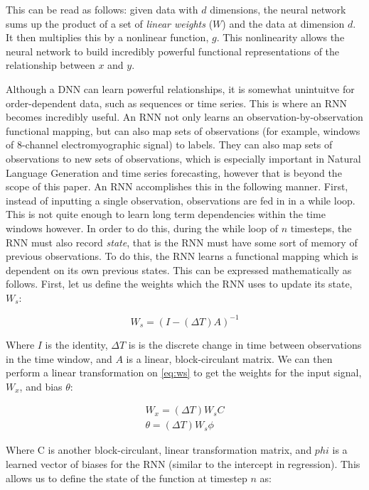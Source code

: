 \documentclass{llncs}
\begin{document}
 This can be read as follows: given data with $d$ dimensions, the neural network sums up the product of a set of \textit{linear weights} ($W$) and the data at dimension $d$. It then multiplies this by a nonlinear function, $g$. This nonlinearity allows the neural network to build incredibly powerful functional representations of the relationship between $x$ and $y$.
 
 Although a DNN can learn powerful relationships, it is somewhat unintuitve for order-dependent data, such as sequences or time series. This is where an RNN becomes incredibly useful. An RNN not only learns an observation-by-observation functional mapping, but can also map sets of observations (for example, windows of 8-channel electromyographic signal) to labels. They can also map sets of observations to new sets of observations, which is especially important in Natural Language Generation and time series forecasting, however that is beyond the scope of this paper. 
 An RNN accomplishes this in the following manner. 
 First, instead of inputting a single observation, observations are fed in in a while loop. 
 This is not  quite enough to learn long term dependencies within the time windows however. 
 In order to do this, during the while loop of $n$ timesteps, the RNN must also record \emph{state}, that is the RNN must have some sort of memory of previous observations. 
 To do this, the RNN learns a functional mapping which is dependent on its own previous states. This can be expressed mathematically as follows. First, let us define the weights which the RNN uses to update its state, $W_s$:

 \begin{equation}\label{eq:ws}
	 W_s = \left(  I - \left(\Delta T\right) A\right)^{-1}
 \end{equation}
  
 Where $I$ is the identity, $\Delta T$ is is the discrete change in time between observations in the time window, and $A$ is a linear, block-circulant matrix. We can then perform a linear transformation on \autoref{eq:ws} to get the weights for the input signal, $W_x$, and bias $\theta$:

 \begin{align}
	 W_x = \left(\Delta T\right) W_s  C \\
	 \theta = \left(\Delta T\right) W_s \phi
 \end{align}
 
 Where C is another block-circulant, linear transformation matrix, and $phi$ is a learned vector of biases for the RNN (similar to the intercept in regression). This allows us to define the state of the function at timestep $n$ as:
\end{document}
